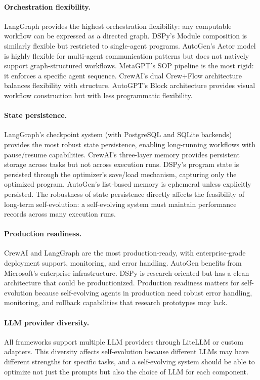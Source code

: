 \paragraph{Orchestration flexibility.}
LangGraph provides the highest orchestration flexibility: any computable workflow can be expressed as a directed graph. DSPy's Module composition is similarly flexible but restricted to single-agent programs. AutoGen's Actor model is highly flexible for multi-agent communication patterns but does not natively support graph-structured workflows. MetaGPT's SOP pipeline is the most rigid: it enforces a specific agent sequence. CrewAI's dual Crew+Flow architecture balances flexibility with structure. AutoGPT's Block architecture provides visual workflow construction but with less programmatic flexibility.

\paragraph{State persistence.}
LangGraph's checkpoint system (with PostgreSQL and SQLite backends) provides the most robust state persistence, enabling long-running workflows with pause/resume capabilities. CrewAI's three-layer memory provides persistent storage across tasks but not across execution runs. DSPy's program state is persisted through the optimizer's save/load mechanism, capturing only the optimized program. AutoGen's list-based memory is ephemeral unless explicitly persisted. The robustness of state persistence directly affects the feasibility of long-term self-evolution: a self-evolving system must maintain performance records across many execution runs.

\paragraph{Production readiness.}
CrewAI and LangGraph are the most production-ready, with enterprise-grade deployment support, monitoring, and error handling. AutoGen benefits from Microsoft's enterprise infrastructure. DSPy is research-oriented but has a clean architecture that could be productionized. Production readiness matters for self-evolution because self-evolving agents in production need robust error handling, monitoring, and rollback capabilities that research prototypes may lack.

\paragraph{LLM provider diversity.}
All frameworks support multiple LLM providers through LiteLLM or custom adapters. This diversity affects self-evolution because different LLMs may have different strengths for specific tasks, and a self-evolving system should be able to optimize not just the prompts but also the choice of LLM for each component.

